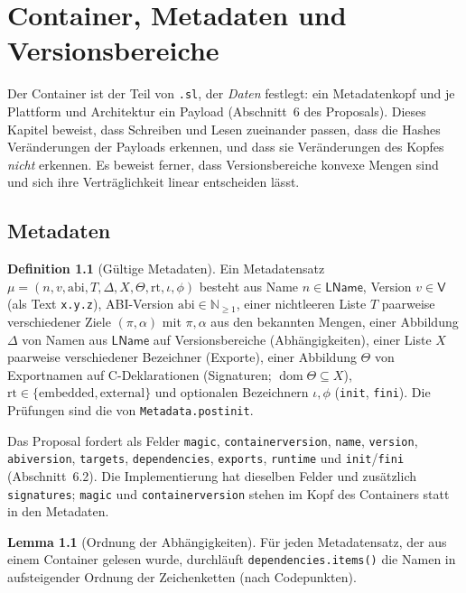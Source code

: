 \documentclass[a4paper,12pt,twoside]{report}
\DeclareRobustCommand{\_}{\ifmmode\mbox{\textunderscore}\else\textunderscore\allowbreak{}\fi}
\theoremstyle{definition}
\newtheorem{definition}{Definition}[chapter]
\newtheorem{lemma}{Lemma}[chapter]
\newcommand{\N}{\mathbb{N}}
\newcommand{\dom}{\operatorname{dom}}
\begin{document}
\chapter{Container, Metadaten und Versionsbereiche}
\label{chap:container}

Der Container ist der Teil von \texttt{.sl}, der \emph{Daten} festlegt: ein Metadatenkopf und je Plattform und Architektur ein Payload (Abschnitt~6 des Proposals). Dieses Kapitel beweist, dass Schreiben und Lesen zueinander passen, dass die Hashes Veränderungen der Payloads erkennen, und dass sie Veränderungen des Kopfes \emph{nicht} erkennen. Es beweist ferner, dass Versionsbereiche konvexe Mengen sind und sich ihre Verträglichkeit linear entscheiden lässt.

\section{Metadaten}

\begin{definition}[Gültige Metadaten]
	\label{def:meta}
	Ein Metadatensatz $\mu=(n,v,\mathrm{abi},T,\Delta,X,\Theta,\mathrm{rt},\iota,\phi)$ besteht aus Name $n\in\mathsf{LName}$, Version $v\in\mathsf V$ (als Text \texttt{x.y.z}), ABI-Version $\mathrm{abi}\in\N_{\ge1}$, einer nichtleeren Liste $T$ paarweise verschiedener Ziele $(\pi,\alpha)$ mit $\pi,\alpha$ aus den bekannten Mengen, einer Abbildung $\Delta$ von Namen aus $\mathsf{LName}$ auf Versionsbereiche (Abhängigkeiten), einer Liste $X$ paarweise verschiedener Bezeichner (Exporte), einer Abbildung $\Theta$ von Exportnamen auf C-Deklarationen (Signaturen; $\dom\Theta\subseteq X$), $\mathrm{rt}\in\{\text{embedded},\text{external}\}$ und optionalen Bezeichnern $\iota,\phi$ (\texttt{init}, \texttt{fini}). Die Prüfungen sind die von \texttt{Metadata.\_\_post\_init\_\_}.
\end{definition}

Das Proposal fordert als Felder \texttt{magic}, \texttt{container\_version}, \texttt{name}, \texttt{version}, \texttt{abi\_version}, \texttt{targets}, \texttt{dependencies}, \texttt{exports}, \texttt{runtime} und \texttt{init}/\texttt{fini} (Abschnitt~6.2). Die Implementierung hat dieselben Felder und zusätzlich \texttt{signatures}; \texttt{magic} und \texttt{container\_version} stehen im Kopf des Containers statt in den Metadaten.

\begin{lemma}[Ordnung der Abhängigkeiten]
	\label{lem:depord}
	Für jeden Metadatensatz, der aus einem Container gelesen wurde, durchläuft \texttt{dependencies.items()} die Namen in aufsteigender Ordnung der Zeichenketten (nach Codepunkten).
\end{lemma}
\end{document}
